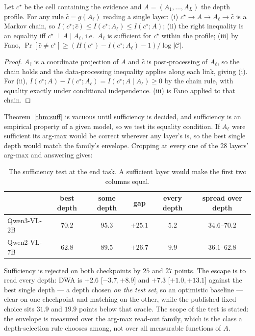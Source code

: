 \begin{theorem}\label{thm:suff}
Let $c^\star$ be the cell containing the evidence and $A=(A_1,\dots,A_L)$ the depth profile. For any rule
$\hat c=g(A_\ell)$ reading a single layer: (i) $c^\star\to A\to A_\ell\to\hat c$ is a Markov chain, so
$I(c^\star;\hat c)\le I(c^\star;A_\ell)\le I(c^\star;A)$; (ii) the right inequality is an equality iff
$c^\star\perp A\mid A_\ell$, i.e.\ $A_\ell$ is sufficient for $c^\star$ within the profile; (iii) by Fano,
$\Pr[\hat c\neq c^\star]\ge(H(c^\star)-I(c^\star;A_\ell)-1)/\log|\mathcal{C}|$.
\end{theorem}

\begin{proof}
$A_\ell$ is a coordinate projection of $A$ and $\hat c$ is post-processing of $A_\ell$, so the chain holds and
the data-processing inequality applies along each link, giving (i). For (ii),
$I(c^\star;A)-I(c^\star;A_\ell)=I(c^\star;A\mid A_\ell)\ge0$ by the chain rule, with equality exactly under
conditional independence. (iii) is Fano applied to that chain.
\end{proof}

Theorem~\ref{thm:suff} is vacuous until sufficiency is decided, and sufficiency is an empirical property of a
given model, so we test its equality condition. If $A_\ell$ were sufficient its arg-max would be correct
wherever any layer's is, so the best single depth would match the family's envelope. Cropping at every one of
the $28$ layers' arg-max and answering gives:

\begin{table}[h]\centering\small
\setlength{\tabcolsep}{5pt}
\caption{The sufficiency test at the end task. A sufficient layer would make the first two columns equal.}
\begin{tabular}{lccccc}
\toprule
& best depth & some depth & gap & every depth & spread over depth\\
\midrule
Qwen3-VL-2B & $70.2$ & $\mathbf{95.3}$ & $+25.1$ & $5.2$ & $34.6$--$70.2$\\
Qwen2-VL-7B & $62.8$ & $\mathbf{89.5}$ & $+26.7$ & $9.9$ & $36.1$--$62.8$\\
\bottomrule
\end{tabular}\label{tab:suff}
\end{table}

Sufficiency is rejected on both checkpoints by $25$ and $27$ points. The escape is to read every depth: DWA
is $+2.6$ [$-3.7,+8.9$] and $+7.3$ [$+1.0,+13.1$] against the best single depth --- a depth chosen \emph{on
the test set}, so an optimistic baseline --- clear on one checkpoint and matching on the other, while the
published fixed choice sits $31.9$ and $19.9$ points below that oracle. The scope of the test is stated: the
envelope is measured over the arg-max read-out family, which is the class a depth-selection rule chooses among,
not over all measurable functions of $A$.

